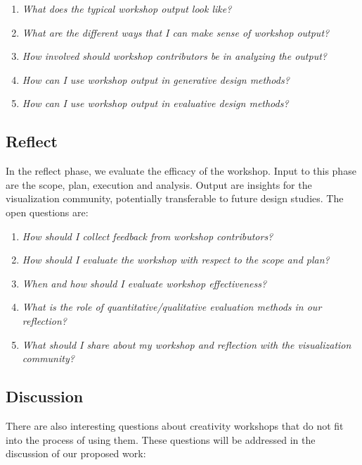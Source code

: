 \begin{enumerate}
    \item \emph{What does the typical workshop output look like?}
    \item \emph{What are the different ways that I can make sense of workshop output?}
    \item \emph{How involved should workshop contributors be in analyzing the output?}
    \item \emph{How can I use workshop output in generative design methods?}
    \item \emph{How can I use workshop output in evaluative design methods?}
\end{enumerate}

\subsection*{Reflect}

In the reflect phase, we evaluate the efficacy of the workshop. Input to this phase are the scope, plan, execution and analysis. Output are insights for the visualization community, potentially transferable to future design studies. The open questions are:

\begin{enumerate}
    \item \emph{How should I collect feedback from workshop contributors?}
    \item \emph{How should I evaluate the workshop with respect to the scope and plan?}
    \item \emph{When and how should I evaluate workshop effectiveness?}    
    \item \emph{What is the role of quantitative/qualitative evaluation methods in our reflection?}
    \item \emph{What should I share about my workshop and reflection with the visualization community?}
\end{enumerate}

\subsection*{Discussion}

There are also interesting questions about creativity workshops that do not fit into the process of using them. These questions will be addressed in the discussion of our proposed work:

